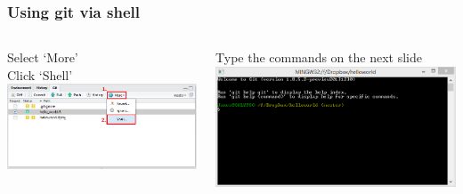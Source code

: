 \documentclass{beamer}\usepackage[]{graphicx}\usepackage[]{color}
\begin{document}
\begin{frame}
\frametitle{Using git via shell}

\begin{columns}[t]
\centering
\begin{block}{Select `More' \\ Click `Shell'}
\centering
\includegraphics[scale=0.32]{img/project/access_shell_git.png}
\end{block}
\centering
\begin{block}{Type the commands on the next slide}
\centering
\includegraphics[scale=0.34]{img/git/git_terminal.png}
\end{block}
\end{columns}

\end{frame}
\end{document}
